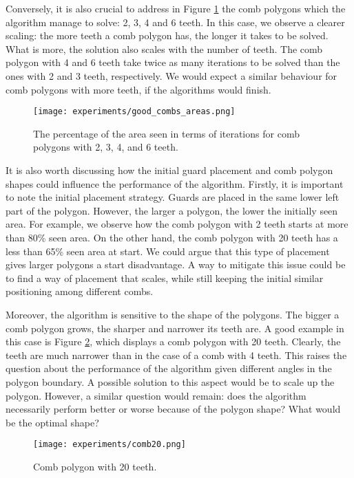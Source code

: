 Conversely, it is also crucial to address in Figure \ref{fig:good_combs} the comb polygons which the algorithm manage to solve: 2, 3, 4 and 6 teeth. In this case, we  observe a clearer scaling: the more teeth a comb polygon has, the longer it takes to be solved. What is more, the solution also scales with the number of teeth. The comb polygon with 4 and 6 teeth take twice as many iterations to be solved than the ones with 2 and 3 teeth, respectively. We would expect a similar behaviour for comb polygons with more teeth, if the algorithms would finish.

\begin{figure}[h!]
    \centering
    \texttt{[image: experiments/good\_combs\_areas.png]}
    \caption{The percentage of the area seen in terms of iterations for comb polygons with 2, 3, 4, and 6 teeth.}
    \label{fig:good_combs}
\end{figure}

\newpage
It is also worth discussing how the initial guard placement and comb polygon shapes could influence the performance of the algorithm.
Firstly, it is important to note the initial placement strategy. Guards are placed in the same lower left part of the polygon. However, the larger a polygon, the lower the initially seen area. For example, we  observe how the comb polygon with 2 teeth starts at more than 80\% seen area. On the other hand, the comb polygon with 20 teeth has a less than 65\% seen area at start. We could argue that this type of placement gives larger polygons a start disadvantage. A way to mitigate this issue could be to find a way of placement that scales, while still keeping the initial similar positioning among different combs.

Moreover, the algorithm is sensitive to the shape of the polygons. The bigger a comb polygon grows, the sharper and narrower its teeth are. A good example in this case is Figure \ref{fig:comb20}, which displays a comb polygon with 20 teeth. Clearly, the teeth are much narrower than in the case of a comb with 4 teeth. This raises the question about the performance of the algorithm given different angles in the polygon boundary. A possible solution to this aspect would be to scale up the polygon. However, a similar question would remain: does the algorithm necessarily perform better or worse because of the polygon shape? What would be the optimal shape?

\begin{figure}[h!]
    \centering
    \texttt{[image: experiments/comb20.png]}
    \caption{Comb polygon with 20 teeth.}
    \label{fig:comb20}
\end{figure}

